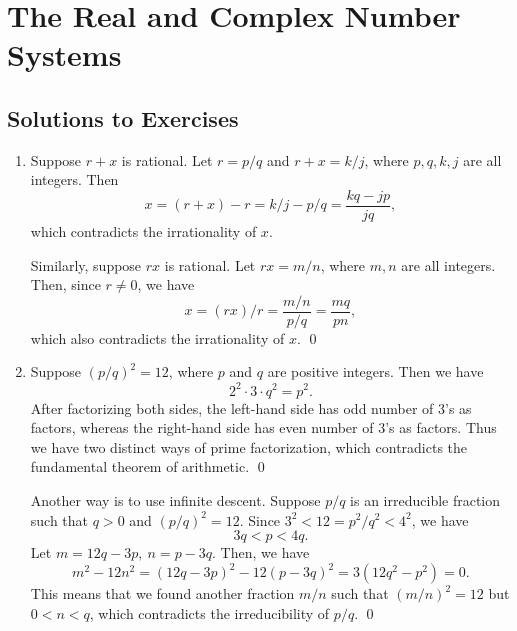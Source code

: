 
\chapter{The Real and Complex Number Systems}
\label{ch:01}

\section{Solutions to Exercises}

\begin{enumerate}
\item Suppose \(r+x\) is rational.  Let \(r = p/q\) and \(r+x = k/j\), where \(p,q,k,j\) are all integers.  Then
  \begin{equation*}
    x = (r+x) - r = k/j - p/q = \frac{kq - jp}{jq},
  \end{equation*}
  which contradicts the irrationality of \(x\).

  Similarly, suppose \(rx\) is rational.  Let \(rx = m/n\), where \(m,n\) are all integers.  Then, since \(r \ne 0\), we have
  \begin{equation*}
    x = (rx)/r = \frac{m/n}{p/q} = \frac{mq}{pn},
  \end{equation*}
  which also contradicts the irrationality of \(x\).
  \qed

\item Suppose \((p/q)^2 = 12\), where \(p\) and \(q\) are positive integers.  Then we have
  \begin{equation*}
    2^2 \cdot 3 \cdot q^2 = p^2.
  \end{equation*}
  After factorizing both sides, the left-hand side has odd number of \(3\)'s as factors, whereas the right-hand side has even number of \(3\)'s as factors.  Thus we have two distinct ways of prime factorization, which contradicts the fundamental theorem of arithmetic.
  \qed

  Another way is to use infinite descent.  Suppose \(p/q\) is an irreducible fraction such that \(q > 0\) and \((p/q)^2 = 12\).  Since \(3^2 < 12 = p^2/q^2 < 4^2\), we have
  \begin{equation*}
    3q < p < 4q.
  \end{equation*}
  Let \(m = 12q - 3p,\ n = p - 3q\).  Then, we have
  \begin{equation*}
    m^2 - 12n^2
    = (12q - 3p)^2 - 12(p - 3q)^2
    = 3(12q^2 - p^2)
    = 0.
  \end{equation*}
  This means that we found another fraction \(m/n\) such that \((m/n)^2 = 12\) but \(0 < n < q\), which contradicts the irreducibility of \(p/q\).
  \qed


\end{enumerate}
